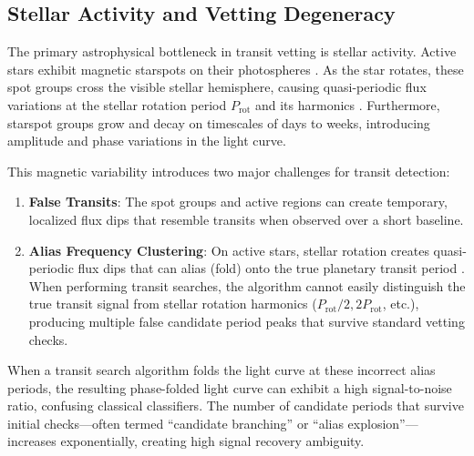 \subsection{Stellar Activity and Vetting Degeneracy} \label{sec:stellar_activity}
The primary astrophysical bottleneck in transit vetting is stellar activity. Active stars exhibit magnetic starspots on their photospheres \citep{Meunier2010, Aigrain2012}. As the star rotates, these spot groups cross the visible stellar hemisphere, causing quasi-periodic flux variations at the stellar rotation period $P_{\text{rot}}$ and its harmonics \citep{McQuillan2013, McQuillan2014, Reinhold2013}. Furthermore, starspot groups grow and decay on timescales of days to weeks, introducing amplitude and phase variations in the light curve.

This magnetic variability introduces two major challenges for transit detection:
\begin{enumerate}
\item \textbf{False Transits}: The spot groups and active regions can create temporary, localized flux dips that resemble transits when observed over a short baseline.
\item \textbf{Alias Frequency Clustering}: On active stars, stellar rotation creates quasi-periodic flux dips that can alias (fold) onto the true planetary transit period \citep{Dawson2010}. When performing transit searches, the algorithm cannot easily distinguish the true transit signal from stellar rotation harmonics ($P_{\text{rot}}/2, 2 P_{\text{rot}}$, etc.), producing multiple false candidate period peaks that survive standard vetting checks.
\end{enumerate}

When a transit search algorithm folds the light curve at these incorrect alias periods, the resulting phase-folded light curve can exhibit a high signal-to-noise ratio, confusing classical classifiers. The number of candidate periods that survive initial checks---often termed ``candidate branching'' or ``alias explosion''---increases exponentially, creating high signal recovery ambiguity.

